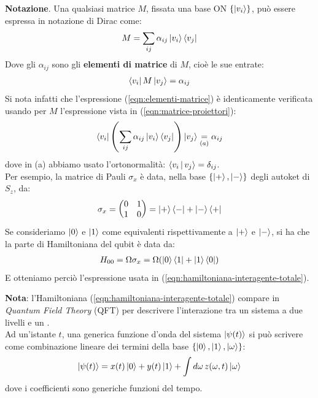 \documentclass[../../InformazioneQuantistica.tex]{subfiles}
\begin{document}
\begin{expl}
\textbf{Notazione}. Una qualsiasi matrice $M$, fissata una base ON $\{\Ket{v_i}\}$, può essere espressa in notazione di Dirac come:
\begin{align}
M = \sum_{ij} \alpha_{ij} \Ket{v_i}\Bra{v_j}
\label{eqn:matrice-proiettori}
\end{align}
Dove gli $\alpha_{ij}$ sono gli \textbf{elementi di matrice} di $M$, cioè le sue entrate:
\begin{align}
\Bra{v_i}M\Ket{v_j} = \alpha_{ij}
\label{eqn:elementi-matrice}
\end{align}
Si nota infatti che l'espressione (\ref{eqn:elementi-matrice}) è identicamente verificata usando per $M$ l'espressione vista in (\ref{eqn:matrice-proiettori}):
\begin{align*}
\Bra{v_i}\left(\sum_{ij}\alpha_{ij}\Ket{v_i}\Bra{v_j}\right)\Ket{v_j} \underset{(a)}{=} \alpha_{ij}
\end{align*}
dove in (a) abbiamo usato l'ortonormalità: $\Braket{v_i|v_j} = \delta_{ij}$.\\
Per esempio, la matrice di Pauli $\sigma_x$ è data, nella base $\{\Ket{+}, \Ket{-}\}$ degli autoket di $S_z$, da:
\begin{align*}
\sigma_x = \begin{pmatrix}0 & 1\\1 & 0
\end{pmatrix} = \Ket{+}\Bra{-} + \Ket{-}\Bra{+}
\end{align*}
Se consideriamo $\Ket{0}$ e $\Ket{1}$ come equivalenti rispettivamente a $\Ket{+}$ e $\Ket{-}$, si ha che la parte di Hamiltoniana del qubit è data da:
\begin{align*}
H_{00} = \Omega \sigma_x = \Omega(\Ket{0}\Bra{1}+\Ket{1}\Bra{0})
\end{align*}
E otteniamo perciò l'espressione usata in (\ref{eqn:hamiltoniana-interagente-totale}).
\end{expl}
 
\textbf{Nota}: l'Hamiltoniana (\ref{eqn:hamiltoniana-interagente-totale}) compare in \textit{Quantum Field Theory} (QFT) per descrivere l'interazione tra un sistema a due livelli e un .\\


Ad un'istante $t$, una generica funzione d'onda del sistema $\Ket{\psi(t)}$ si può scrivere come combinazione lineare dei termini della base $\{\Ket{0}, \Ket{1}, \Ket{\omega}\}$:
\begin{align*}
\Ket{\psi(t)} = x(t)\Ket{0} + y(t)\Ket{1} + \int d\omega\, z(\omega, t)\Ket{\omega}
\end{align*}
dove i coefficienti sono generiche funzioni del tempo.\\
\end{document}
